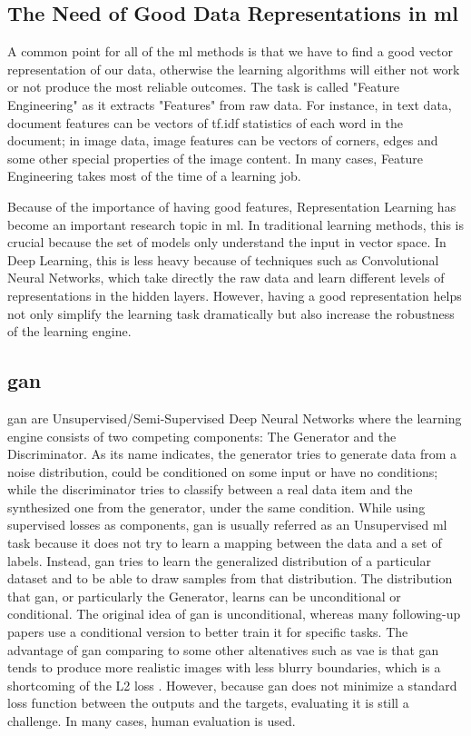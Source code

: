 \subsection{The Need of Good Data Representations in \acrshort{ml}}
A common point for all of the \acrshort{ml} methods is that we have to find a good vector
representation of our data, otherwise the learning algorithms will either not work or not
produce the most reliable outcomes. The task is called "Feature Engineering" as it
extracts "Features" from raw data. For instance, in text data, document features can be
vectors of tf.idf statistics of each word in the document; in image data, image features
can be vectors of corners, edges and some other special properties of the image content.
In many cases, Feature Engineering takes most of the time of a learning job.

Because of the importance of having good features, Representation Learning has become an
important research topic in \acrshort{ml}. In traditional learning methods, this is
crucial because the set of models only understand the input in vector space. In Deep
Learning, this is less heavy because of techniques such as Convolutional Neural Networks,
which take directly the raw data and learn different levels of representations in the
hidden layers. However, having a good representation helps not only simplify the learning
task dramatically but also increase the robustness of the learning engine.

\subsection{\acrfull{gan} \label{subsec:intro_gan}}
\acrlong{gan} \cite{gan} are Unsupervised/Semi-Supervised Deep Neural Networks where the
learning engine consists of two competing components: The Generator and the Discriminator.
As its name indicates, the generator tries to generate data from a noise distribution,
could be conditioned on some input or have no conditions; while the discriminator tries to
classify between a real data item and the synthesized one from the generator, under the
same condition. While using supervised losses as components, \acrshort{gan} is usually
referred as an Unsupervised \acrshort{ml} task because it does not try to learn a mapping
between the data and a set of labels. Instead, \acrshort{gan} tries to learn the
generalized distribution of a particular dataset and to be able to draw samples from that
distribution. The distribution that \acrshort{gan}, or particularly the Generator, learns
can be unconditional or conditional. The original idea of \acrshort{gan} is unconditional,
whereas many following-up papers use a conditional version to better train it for specific
tasks. The advantage of \acrshort{gan} comparing to some other altenatives such as
\acrfull{vae} \cite{vae} is that \acrshort{gan} tends to produce more realistic images
with less blurry boundaries, which is a shortcoming of the L2 loss \cite{gan}.  However,
because \acrshort{gan} does not minimize a standard loss function between the outputs and
the targets, evaluating it is still a challenge. In many cases, human evaluation is used.

